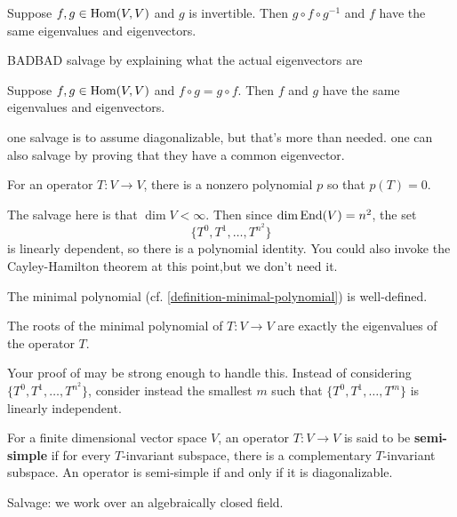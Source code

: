\documentclass{homework}
\begin{document}
\begin{problem}
  Suppose $f, g \in \operatorname{Hom}(V,V)$ and $g$ is invertible.  Then $g \circ f \circ g^{-1}$ and $f$ have the same eigenvalues and eigenvectors.
\end{problem}

\begin{solution}
  BADBAD salvage by explaining what the actual eigenvectors are
\end{solution}

\begin{problem}
  Suppose $f,g \in \operatorname{Hom}(V,V)$ and $f \circ g = g \circ f$.  Then $f$ and $g$ have the same eigenvalues and eigenvectors.
\end{problem}

\begin{solution} one salvage is to assume diagonalizable, but that's more than needed.  one can also salvage by proving that they have a common eigenvector.
\end{solution}

\begin{problem}\label{every-operator-satisfies-a-polynomial}
  For an operator $T : V \to V$, there is a nonzero polynomial $p$
  so that $p(T) = 0$.
\end{problem}

\begin{solution}
  The salvage here is that $\dim V < \infty$.  Then since $\dim \operatorname{End}(V) = n^2$, the set
  \[
    \{ T^0, T^1, \ldots, T^{n^2} \}
  \]
  is linearly dependent, so there is a polynomial identity.  You could also invoke the Cayley-Hamilton theorem at this point,but we don't need it.
\end{solution}

\begin{problem}
  The minimal polynomial (cf. \ref{definition-minimal-polynomial}) is well-defined.
\end{problem}

\begin{problem}
  The roots of the minimal polynomial of $T : V \to V$ are exactly the
  eigenvalues of the operator $T$.
\end{problem}

\begin{solution}
  Your proof of \label{every-operator-satisfies-a-polynomial} may be strong enough to handle this.  Instead of considering $\{ T^0, T^1, \ldots, T^{n^2} \}$, consider instead the smallest $m$ such that $\{ T^0, T^1, \ldots, T^{m} \}$ is linearly independent.
\end{solution}

\begin{problem}
  For a finite dimensional vector space $V$, an operator $T : V \to V$
  is said to be \textbf{semi-simple} if for every $T$-invariant
  subspace, there is a complementary $T$-invariant subspace.  An
  operator is semi-simple if and only if it is diagonalizable.
\end{problem}
\begin{solution}
  Salvage: we work over an algebraically closed field.
\end{solution}
\end{document}
